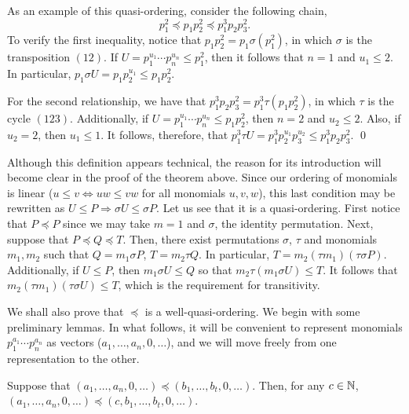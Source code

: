 \begin{example}
As an example of this quasi-ordering, consider the following
chain, \[p_1^2 \preceq p_1p_2^2 \preceq p_1^3p_2p_3^2.\]  To
verify the first inequality, notice that $p_1p_2^2 = p_1 \sigma
(p_1^2)$, in which $\sigma$ is the transposition $(12)$.  If $U =
p_1^{u_1}\cdots p_n^{u_n} \leq p_1^2$, then it follows that $n =
1$ and $u_1 \leq 2$.  In particular, $p_1 \sigma U = p_1p_2^{u_1}
\leq p_1p_2^2$.

For the second relationship, we have that $p_1^3p_2p_3^2 = p_1^3
\tau (p_1p_2^2)$, in which $\tau$ is the cycle $(123)$.
Additionally, if $U = p_1^{u_1}\cdots p_n^{u_n} \leq p_1p_2^2$,
then $n = 2$ and $u_2 \leq 2$.  Also, if $u_2 = 2$, then $u_1 \leq
1$.  It follows, therefore, that $p_1^3 \tau U = p_1^3
p_2^{u_1}p_3^{u_2} \leq p_1^3p_2p_3^2$. \qed
\end{example}

Although this definition appears technical, the reason for its
introduction will become clear in the proof of the theorem above.
Since our ordering of monomials is linear ($u \leq v
\Longleftrightarrow uw \leq vw$ for all monomials $u,v,w$), this
last condition may be rewritten as $U \leq P \Rightarrow \sigma U
\leq \sigma P$.  Let us see that it is a quasi-ordering. First
notice that $P \preceq P$ since we may take $m = 1$ and $\sigma$,
the identity permutation.  Next, suppose that $P \preceq Q \preceq
T$. Then, there exist permutations $\sigma$, $\tau$ and monomials
$m_1,m_2$ such that $Q = m_1 \sigma P$, $T = m_2 \tau Q$.  In
particular, $T = m_2 (\tau m_1)(\tau \sigma P)$.  Additionally, if
$U \leq P$, then $m_1 \sigma U \leq Q$ so that $m_2 \tau (m_1
\sigma U) \leq T$.  It follows that $m_2 (\tau m_1)(\tau \sigma U)
\leq T$, which is the requirement for transitivity.

We shall also prove that $\preceq$ is a well-quasi-ordering. We
begin with some preliminary lemmas.  In what follows, it will be
convenient to represent monomials $p_1^{a_1}\cdots p_n^{a_n}$ as
vectors ($a_1,\ldots,a_n,0,\ldots$), and we will move freely from
one representation to the other.

\begin{lemma}\label{oneshiftuplem}
Suppose that $(a_1,\ldots,a_n,0,\ldots) \preceq
(b_1,\ldots,b_t,0,\ldots)$. Then, for any $c \in {\mathbb N}$,
$(a_1,\ldots,a_n,0,\ldots) \preceq (c,b_1,\ldots,b_t,0,\ldots)$.
\end{lemma}

